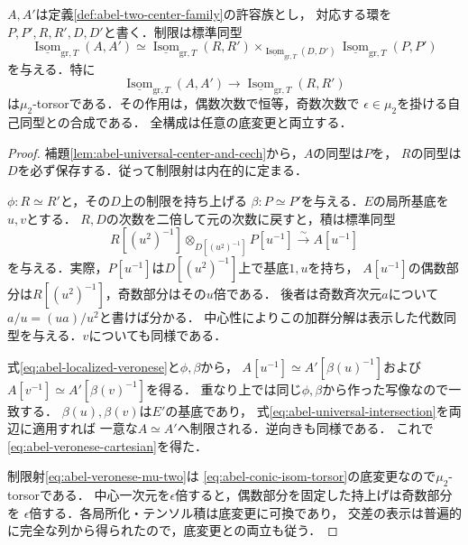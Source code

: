 \begin{theorem}[相対偶数Veronese復元と同型層]
\label{thm:abel-relative-veronese-isom}
$A,A'$は定義\ref{def:abel-two-center-family}の許容族とし，
対応する環を$P,P',R,R',D,D'$と書く．制限は標準同型
\begin{equation}\label{eq:abel-veronese-cartesian}
 \underline{\operatorname{Isom}}_{\mathrm{gr},T}(A,A')
 \simeq
 \underline{\operatorname{Isom}}_{\mathrm{gr},T}(R,R')
 \mathop{\times}_{\underline{\operatorname{Isom}}_{\mathrm{gr},T}(D,D')}
 \underline{\operatorname{Isom}}_{\mathrm{gr},T}(P,P')
\end{equation}
を与える．特に
\begin{equation}\label{eq:abel-veronese-mu-two}
 \underline{\operatorname{Isom}}_{\mathrm{gr},T}(A,A')
   \longrightarrow
 \underline{\operatorname{Isom}}_{\mathrm{gr},T}(R,R')
\end{equation}
は$\mu_2$-torsorである．その作用は，偶数次数で恒等，奇数次数で
$\epsilon\in\mu_2$を掛ける自己同型との合成である．
全構成は任意の底変更と両立する．
\end{theorem}
\begin{proof}
補題\ref{lem:abel-universal-center-and-cech}から，$A$の同型は$P$を，
$R$の同型は$D$を必ず保存する．従って制限射は内在的に定まる．

$\phi:R\simeq R'$と，その$D$上の制限を持ち上げる
$\beta:P\simeq P'$を与える．$E$の局所基底を$u,v$とする．
$R,D$の次数を二倍して元の次数に戻すと，積は標準同型
\begin{equation}\label{eq:abel-localized-veronese}
 R[(u^2)^{-1}]
    \otimes_{D[(u^2)^{-1}]}P[u^{-1}]
       \xrightarrow{\sim} A[u^{-1}]
\end{equation}
を与える．実際，$P[u^{-1}]$は$D[(u^2)^{-1}]$上で基底$1,u$を持ち，
$A[u^{-1}]$の偶数部分は$R[(u^2)^{-1}]$，奇数部分はその$u$倍である．
後者は奇数斉次元$a$について$a/u=(ua)/u^2$と書けば分かる．
中心性によりこの加群分解は表示した代数同型を与える．$v$についても同様である．

式\eqref{eq:abel-localized-veronese}と$\phi,\beta$から，
$A[u^{-1}]\simeq A'[\beta(u)^{-1}]$および
$A[v^{-1}]\simeq A'[\beta(v)^{-1}]$を得る．
重なり上では同じ$\phi,\beta$から作った写像なので一致する．
$\beta(u),\beta(v)$は$E'$の基底であり，
式\eqref{eq:abel-universal-intersection}を両辺に適用すれば
一意な$A\simeq A'$へ制限される．逆向きも同様である．
これで\eqref{eq:abel-veronese-cartesian}を得た．

制限射\eqref{eq:abel-veronese-mu-two}は
\eqref{eq:abel-conic-isom-torsor}の底変更なので$\mu_2$-torsorである．
中心一次元を$\epsilon$倍すると，偶数部分を固定した持上げは奇数部分を
$\epsilon$倍する．各局所化・テンソル積は底変更に可換であり，
交差の表示は普遍的に完全な列から得られたので，底変更との両立も従う．
\end{proof}

